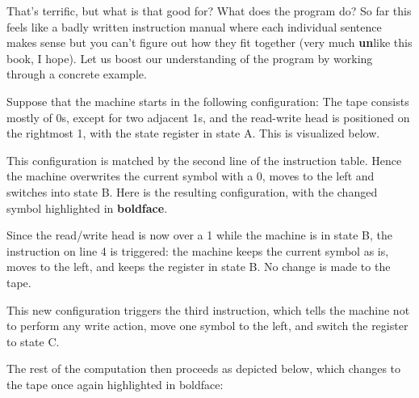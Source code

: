 \begin{examplebox}
    That's terrific, but what is that good for?
    What does the program do?
    So far this feels like a badly written instruction manual where each individual sentence makes sense but you can't figure out how they fit together (very much \textbf{un}like this book, I hope).
    Let us boost our understanding of the program by working through a concrete example.

    Suppose that the machine starts in the following configuration: 
    The tape consists mostly of 0s, except for two adjacent 1s, and the read-write head is positioned on the rightmost 1, with the state register in state A.
    This is visualized below.
    \begin{center}
    \end{center}
    This configuration is matched by the second line of the instruction table.
    Hence the machine overwrites the current symbol with a 0, moves to the left and switches into state B\@.
    Here is the resulting configuration, with the changed symbol highlighted in \textbf{boldface}.
    \begin{center}
    \end{center}
    Since the read/write head is now over a 1 while the machine is in state B, the instruction on line 4 is triggered: the machine keeps the current symbol as is, moves to the left, and keeps the register in state B\@.
    No change is made to the tape.
    \begin{center}
    \end{center}
    This new configuration triggers the third instruction, which tells the machine not to perform any write action, move one symbol to the left, and switch the register to state C\@. 
    \begin{center}
    \end{center}
    The rest of the computation then proceeds as depicted below, which changes to the tape once again highlighted in boldface:
    \begin{center}







\end{center}
\end{examplebox}
